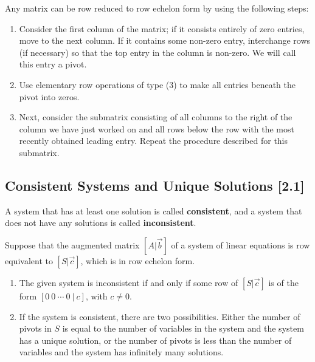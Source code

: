 \documentclass[a4paper,9pt]{extarticle}
\begin{document}
\begin{multicols*}{2}
Any matrix can be row reduced to row echelon form by using the following steps:
\begin{enumerate}[label=\bfseries (\arabic*)] \itemsep0pt \parskip0pt 
    \item Consider the first column of the matrix; if it consists entirely of zero entries, move to the next column. If it contains some non-zero entry, interchange rows (if necessary) so that the top entry in the column is non-zero. We will call this entry a pivot.
    \item Use elementary row operations of type (3) to make all entries beneath the pivot into zeros.
    \item Next, consider the submatrix consisting of all columns to the right of the column we have just worked on and all rows below the row with the most recently obtained leading entry. Repeat the procedure described for this submatrix.
\end{enumerate}



\subsection{Consistent Systems and Unique Solutions [2.1]}
A system that has at least one solution is called \textbf{consistent}, and a system that does not have any solutions is called \textbf{inconsistent}.

Suppose that the augmented matrix $[A | \vec{b}]$ of a system of linear equations is row equivalent to $[S | \vec{c}]$, which is in row echelon form.

\begin{enumerate}[label=\bfseries (\arabic*)] \itemsep0pt \parskip0pt 
    \item The given system is inconsistent if and only if some row of $[S | \vec{c}]$ is of the form $[0 \> 0 \> \cdots \> 0 \> | \> c]$, with $c \neq 0$.
    \item If the system is consistent, there are two possibilities. Either the number of pivots in $S$ is equal to the number of variables in the system and the system has a unique solution, or the number of pivots is less than the number of variables and the system has infinitely many solutions.
\end{enumerate}



\end{multicols*}
\end{document}
